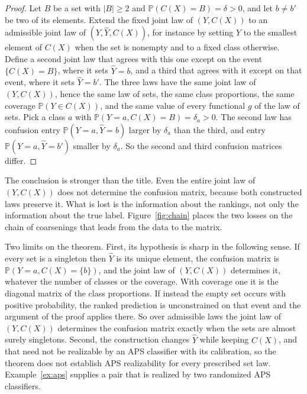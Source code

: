 \documentclass[11pt]{article}
\theoremstyle{definition}
\theoremstyle{definition}
\theoremstyle{remark}
\newcommand{\Prob}{\mathbb{P}}
\newcommand{\set}[1]{\{#1\}}
\begin{document}
\begin{proof}
Let $B$ be a set with $|B| \ge 2$ and $\Prob(C(X) = B) = \delta > 0$, and let $b \ne b'$ be two of
its elements. Extend the fixed joint law of $(Y, C(X))$ to an admissible joint law of $(Y, \hat Y,
C(X))$, for instance by setting $\hat Y$ to the smallest element of $C(X)$ when the set is nonempty
and to a fixed class otherwise. Define a second joint law that agrees with this one except on the
event $\set{C(X) = B}$, where it sets $\hat Y = b$, and a third that agrees with it except on that
event, where it sets $\hat Y = b'$. The three laws have the same joint law
of $(Y, C(X))$, hence the same law of sets, the same class proportions, the same coverage
$\Prob(Y \in C(X))$, and the same value of every functional $g$ of the law of sets. Pick a class $a$ with $\Prob(Y = a, C(X) = B) = \delta_a > 0$. The second law has confusion entry
$\Prob(Y = a, \hat Y = b)$ larger by $\delta_a$ than the third, and entry $\Prob(Y = a, \hat Y = b')$
smaller by $\delta_a$. So the second and third confusion matrices differ.
\end{proof}

The conclusion is stronger than the title. Even the entire joint law of $(Y, C(X))$ does not
determine the confusion matrix, because both constructed laws preserve it. What is lost is the
information about the rankings, not only the information about the true label.
Figure~\ref{fig:chain} places the two losses on the chain of coarsenings that leads from the data
to the matrix.



Two limits on the theorem. First, its hypothesis is sharp in the following sense. If every set is a
singleton then $\hat Y$ is its unique element, the confusion matrix is $\Prob(Y = a, C(X) =
\set{b})$, and the joint law of $(Y, C(X))$ determines it, whatever the number of classes or the
coverage. With coverage one it is the diagonal matrix of the class proportions. If instead the empty
set occurs with positive probability, the ranked prediction is unconstrained on that event and the
argument of the proof applies there. So over admissible laws the joint law of $(Y, C(X))$
determines the confusion matrix exactly when the sets are almost surely singletons. Second, the construction changes $\hat Y$ while keeping $C(X)$, and that
need not be realizable by an APS classifier with its calibration, so the theorem does not establish
APS realizability for every prescribed set law. Example~\ref{ex:aps} supplies a pair that is
realized by two randomized APS classifiers.
\end{document}
